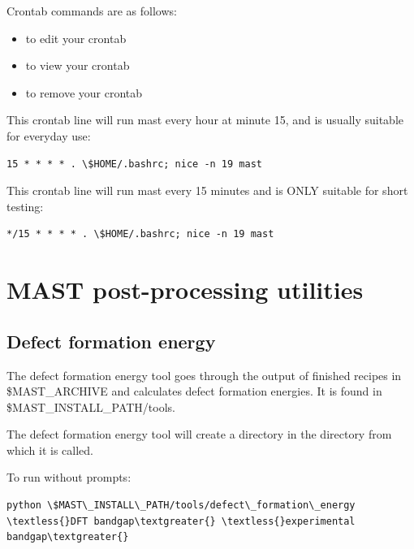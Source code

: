 \documentclass[letterpaper,10pt,english]{sphinxmanual}
\begin{document}
Crontab commands are as follows:
\begin{itemize}
\item {} 
 to edit your crontab

\item {} 
 to view your crontab

\item {} 
 to remove your crontab

\end{itemize}

This crontab line will run mast every hour at minute 15, and is usually suitable for everyday use:

\begin{Verbatim}[commandchars=\\\{\}]
15 * * * * . \$HOME/.bashrc; nice -n 19 mast
\end{Verbatim}

This crontab line will run mast every 15 minutes and is ONLY suitable for short testing:

\begin{Verbatim}[commandchars=\\\{\}]
*/15 * * * * . \$HOME/.bashrc; nice -n 19 mast
\end{Verbatim}


\chapter{MAST post-processing utilities}
\label{6_0_tools::doc}\label{6_0_tools:mast-post-processing-utilities}

\section{Defect formation energy}
\label{6_0_tools:defect-formation-energy}
The defect formation energy tool goes through the output of finished recipes in \$MAST\_ARCHIVE and calculates defect formation energies. It is found in \$MAST\_INSTALL\_PATH/tools.

The defect formation energy tool will create a  directory in the directory from which it is called.

To run without prompts:

\begin{Verbatim}[commandchars=\\\{\}]
python \$MAST\_INSTALL\_PATH/tools/defect\_formation\_energy \textless{}DFT bandgap\textgreater{} \textless{}experimental bandgap\textgreater{}
\end{Verbatim}
\end{document}
